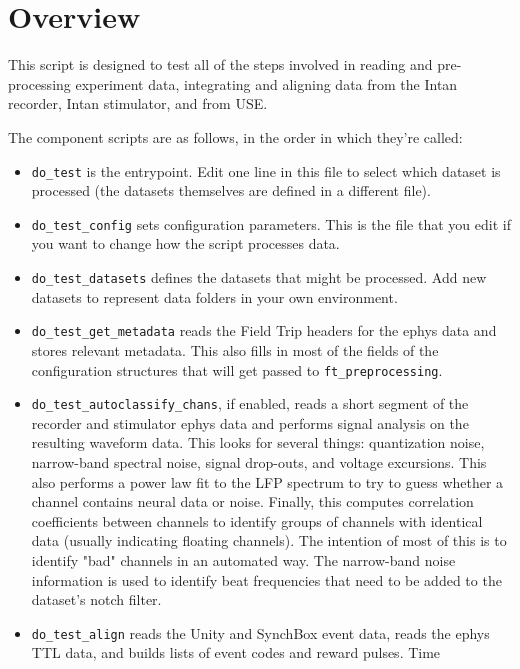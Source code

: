 
\chapter{Overview}
\label{sect-over}

This script is designed to test all of the steps involved in reading and
pre-processing experiment data, integrating and aligning data from the
Intan recorder, Intan stimulator, and from USE.

The component scripts are as follows, in the order in which they're called:

\begin{itemize}
%
\item \verb|do_test| is the entrypoint. Edit one line in this file to
select which dataset is processed (the datasets themselves are defined
in a different file).
%
\item \verb|do_test_config| sets configuration parameters. This is the file
that you edit if you want to change how the script processes data.
%
\item \verb|do_test_datasets| defines the datasets that might be processed.
Add new datasets to represent data folders in your own environment.
%
\item \verb|do_test_get_metadata| reads the Field Trip headers for the
ephys data and stores relevant metadata. This also fills in most of the
fields of the configuration structures that will get passed to
\verb|ft_preprocessing|.
%
\item \verb|do_test_autoclassify_chans|, if enabled, reads a short segment
of the recorder and stimulator ephys data and performs signal analysis on
the resulting waveform data. This looks for several things: quantization
noise, narrow-band spectral noise, signal drop-outs, and voltage excursions.
This also performs a power law fit to the LFP spectrum to try to guess
whether a channel contains neural data or noise. Finally, this computes
correlation coefficients between channels to identify groups of channels with
identical data (usually indicating floating channels). The intention of most
of this is to identify "bad" channels in an automated way. The narrow-band
noise information is used to identify beat frequencies that need to be added
to the dataset's notch filter.
%
\item \verb|do_test_align| reads the Unity and SynchBox event data, reads
the ephys TTL data, and builds lists of event codes and reward pulses. Time

\end{itemize}

